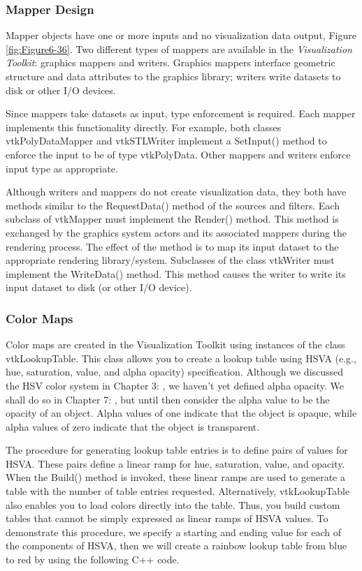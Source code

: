 \subsubsection{Mapper Design}
Mapper objects have one or more inputs and no visualization data output, Figure \ref{fig:Figure6-36}. Two different types of mappers are available in the \emph{Visualization Toolkit}: graphics mappers and writers. Graphics mappers interface geometric structure and data attributes to the graphics library; writers write datasets to disk or other I/O devices.

Since mappers take datasets as input, type enforcement is required. Each mapper implements this functionality directly. For example, both classes vtkPolyDataMapper and vtkSTLWriter implement a SetInput() method to enforce the input to be of type vtkPolyData. Other mappers and writers enforce input type as appropriate.

Although writers and mappers do not create visualization data, they both have methods similar to the RequestData() method of the sources and filters. Each subclass of vtkMapper must implement the Render() method. This method is exchanged by the graphics system actors and its associated mappers during the rendering process. The effect of the method is to map its input dataset to the appropriate rendering library/system. Subclasses of the class vtkWriter must implement the WriteData() method. This method causes the writer to write its input dataset to disk (or other I/O device).

\subsubsection{Color Maps}

Color maps are created in the Visualization Toolkit using instances of the class vtkLookupTable. This class allows you to create a lookup table using HSVA (e.g., hue, saturation, value, and alpha opacity) specification. Although we discussed the HSV color system in Chapter 3: , we haven’t yet defined alpha opacity. We shall do so in Chapter 7:  , but until then consider the alpha value to be the opacity of an object. Alpha values of one indicate that the object is opaque, while alpha values of zero indicate that the object is transparent.

The procedure for generating lookup table entries is to define pairs of values for HSVA. These pairs define a linear ramp for hue, saturation, value, and opacity. When the Build() method is invoked, these linear ramps are used to generate a table with the number of table entries requested. Alternatively, vtkLookupTable also enables you to load colors directly into the table. Thus, you build custom tables that cannot be simply expressed as linear ramps of HSVA values. To demonstrate this procedure, we specify a starting and ending value for each of the components of HSVA, then we will create a rainbow lookup table from blue to red by using the following C++ code.

